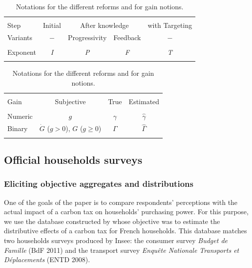 \documentclass[12pt]{article} %
\begin{document}

\begin{table}[H]
\caption{Notations for the different reforms and for gain notions.}
\label{tab:notations}

\centering \begin{tabular}{lcccc}
\\[-1.8ex]\hline 
\hline\\[-2.6ex] Step & Initial & \multicolumn{2}{c}{After knowledge} & with Targeting\tabularnewline

Variants & $-$ & Progressivity & Feedback & $-$\tabularnewline
 \hline \\[-2.3ex] 
Exponent & \emph{I} & \emph{P} & \emph{F} & \emph{T} \\ 
\hline 
\hline \\[-1.8ex] 
\end{tabular}

\medskip

\centering \begin{tabular}{lccc}
\\[-1.8ex]\hline 
\hline \\[-2.6ex] 
Gain & Subjective & True & Estimated\tabularnewline
 \hline \\[-2.3ex] 
Numeric & $g$ & $\gamma$ & $\widehat{\gamma}$\tabularnewline
Binary & $\dot{G}$ ($g>0$), $G$ ($g\geq0$) & $\Gamma$ & $\widehat{\Gamma}$ \\ 
\hline 
\hline \\[-1.8ex] 
\end{tabular}

\end{table}

\subsection{Official households surveys\label{subsec:Households-surveys}}

    \subsubsection{Eliciting objective aggregates and distributions \label{subsubsec:comparing-obj-subj}}

One of the goals of the paper is to compare respondents' perceptions with the actual impact of a carbon tax on households' purchasing power. For this purpose, we use the database constructed by \citet{douenne_2020} whose objective was to estimate the distributive effects of a carbon tax for French households. This database matches two households surveys produced by Insee: the consumer survey \emph{Budget de Famille} (BdF 2011) and the transport survey \emph{Enquête Nationale Transports et Déplacements} (ENTD 2008).
\end{document}
